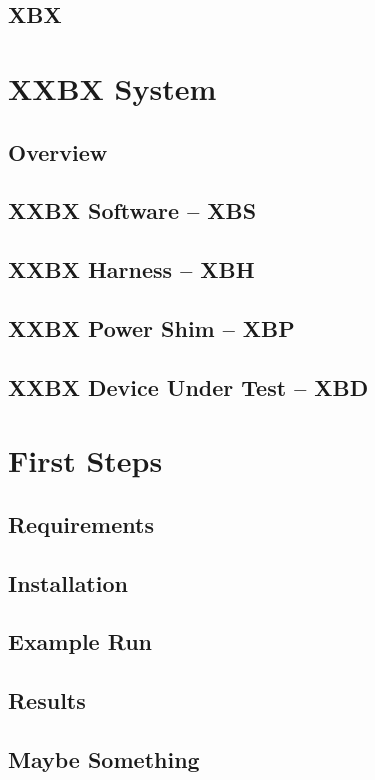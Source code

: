 \documentclass[twoside,11pt]{cergdoc}
\begin{document}
  \section{XBX}
\chapter{XXBX System}
  \section{Overview}
  \section{XXBX Software -- XBS}
  \section{XXBX Harness -- XBH}
  \section{XXBX Power Shim -- XBP}
  \section{XXBX Device Under Test -- XBD}
\chapter{First Steps}
  \section{Requirements}
  \section{Installation}
  \section{Example Run}
  \section{Results}

\begin{appendix}
\chapter{Maybe Something}
\end{appendix}
\end{document}
